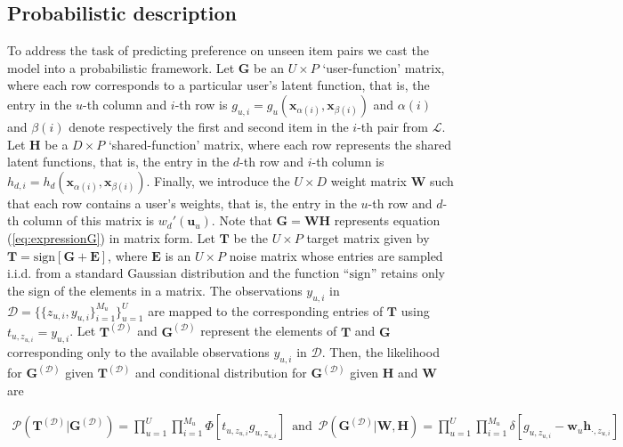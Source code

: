 \subsection{Probabilistic description}

To address the task of predicting preference on unseen item pairs we cast the model into a probabilistic framework.
Let $\mathbf{G}$ be an $U\times P$ `user-function' matrix, where each row corresponds to
a particular user's latent function, that is, the entry in the $u$-th column and $i$-th row is 
$g_{u,i}= g_u(\mathbf{x}_{\alpha(i)},\mathbf{x}_{\beta(i)})$
and $\alpha(i)$ and $\beta(i)$ denote respectively the first and second item in the $i$-th pair from $\mathcal{L}$.
Let $\mathbf{H}$ be a $D\times P$ `shared-function' matrix,
where each row represents the shared latent functions, that is, the entry in the $d$-th row and $i$-th column is 
$h_{d,i}= h_d(\mathbf{x}_{\alpha(i)},\mathbf{x}_{\beta(i)})$.
Finally, we introduce the $U \times D$ weight matrix $\mathbf{W}$ such that each row contains a user's weights, that is, the entry in the $u$-th row and $d$-th column of this matrix is $w_d'(\mathbf{u}_u)$.
Note that $\mathbf{G} = \mathbf{W} \mathbf{H}$ represents equation (\ref{eq:expressionG}) in matrix form.
Let $\mathbf{T}$ be the $U\times P$ target matrix given by $\mathbf{T} = \text{sign}[\mathbf{G} + \mathbf{E}]$,
where $\mathbf{E}$ is an $U \times P$ noise matrix whose entries are sampled i.i.d. from a standard Gaussian distribution and
the function ``$\text{sign}$'' retains only the sign of the elements in a matrix. 
The observations $y_{u,i}$ in $\mathcal{D}=\{\{z_{u,i},y_{u,i}\}_{i=1}^{M_u}\}_{u=1}^{U}$ are
mapped to the corresponding entries of $\mathbf{T}$ using $t_{u,z_{u,i}} = y_{u,i}$.
Let $\mathbf{T}^{(\mathcal{D})}$ and $\mathbf{G}^{(\mathcal{D})}$ represent the elements of $\mathbf{T}$ and $\mathbf{G}$
corresponding only to the available observations $y_{u,i}$ in $\mathcal{D}$.
Then, the likelihood for $\mathbf{G}^{(\mathcal{D})}$ given $\mathbf{T}^{(\mathcal{D})}$ and conditional distribution for $\mathbf{G}^{(\mathcal{D})}$ given $\mathbf{H}$ and $\mathbf{W}$ are

\vspace{-0.675cm}
{\small
\begin{align*}
\mathcal{P}(\mathbf{T}^{(\mathcal{D})}|\mathbf{G}^{(\mathcal{D})}) 
= \prod_{u=1}^U \prod_{i=1}^{M_u} \Phi[t_{u,z_{u,i}} g_{u,z_{u,i}}]\,\,\,\text{and}\,\,\,
\mathcal{P}(\mathbf{G}^{(\mathcal{D})}|\mathbf{W},\mathbf{H}) = 
\prod_{u=1}^{U} \prod_{i=1}^{M_u}\delta[g_{u,z_{u,i}}-\mathbf{w}_u\mathbf{h}_{\cdot,z_{u,i}}]\,
\end{align*}
}

